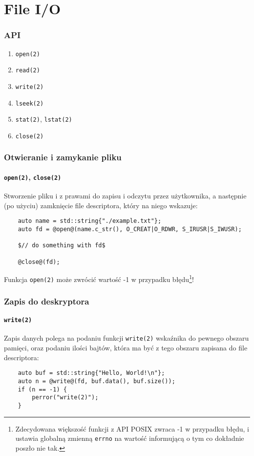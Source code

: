 \documentclass[aspectratio=169]{beamer}
\begin{document}
\section{File I/O}

\begin{frame}
    \frametitle{API}

    \begin{enumerate}
        \item \texttt{open(2)}
        \item \texttt{read(2)}
        \item \texttt{write(2)}
        \item \texttt{lseek(2)}
        \item \texttt{stat(2)}, \texttt{lstat(2)}
        \item \texttt{close(2)}
    \end{enumerate}
\end{frame}

\begin{frame}[fragile]
    \frametitle{Otwieranie i zamykanie pliku}
    \framesubtitle{\texttt{open(2)}, \texttt{close(2)}}

    Stworzenie pliku i z prawami do zapisu i odczytu przez użytkownika, a
    następnie (po użyciu) zamknięcie file descriptora, który na niego wskazuje:

    {\footnotesize
    \begin{lstlisting}
    auto name = std::string{"./example.txt"};
    auto fd = @open@(name.c_str(), O_CREAT|O_RDWR, S_IRUSR|S_IWUSR);

    $// do something with fd$

    @close@(fd);
    \end{lstlisting}}

    Funkcja \texttt{open(2)} może zwrócić wartość -1 w przypadku
    błędu\footnote{Zdecydowana większość funkcji z API POSIX zwraca -1 w
    przypadku błędu, i ustawia globalną zmienną \texttt{errno} na wartość
    informującą o tym co dokładnie poszło nie tak.}!
\end{frame}

\begin{frame}[fragile]
    \frametitle{Zapis do deskryptora}
    \framesubtitle{\texttt{write(2)}}

    Zapis danych polega na podaniu funkcji \texttt{write(2)} wskaźnika do
    pewnego obszaru pamięci, oraz podaniu ilości bajtów, która ma być z tego
    obszaru zapisana do file descriptora:

    {\footnotesize
    \begin{lstlisting}
    auto buf = std::string{"Hello, World!\n"};
    auto n = @write@(fd, buf.data(), buf.size());
    if (n == -1) {
        perror("write(2)");
    }
    \end{lstlisting}}
\end{frame}
\end{document}
